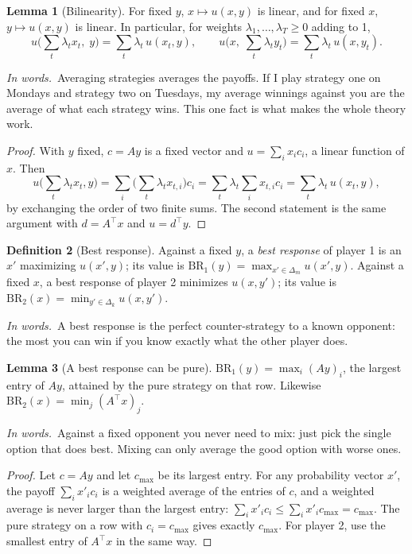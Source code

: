 \documentclass[11pt]{article}
\theoremstyle{definition}
\newtheorem{definition}{Definition}[section]
\newtheorem{lemma}[definition]{Lemma}
\newcommand{\inwords}{\par\smallskip\noindent\textit{In words.}\ }
\begin{document}
\begin{lemma}[Bilinearity]\label{lem:bilinear}
For fixed $y$, $x\mapsto u(x,y)$ is linear, and for fixed $x$, $y\mapsto u(x,y)$ is linear. In particular, for weights
$\lambda_1,\dots,\lambda_T\ge0$ adding to 1,
\[ u\Big(\sum_t\lambda_tx_t,\;y\Big)=\sum_t\lambda_t\,u(x_t,y),\qquad u\Big(x,\;\sum_t\lambda_ty_t\Big)=\sum_t\lambda_t\,u(x,y_t). \]
\inwords Averaging strategies averages the payoffs. If I play strategy one on Mondays and strategy two on Tuesdays, my
average winnings against you are the average of what each strategy wins. This one fact is what makes the whole theory
work.
\end{lemma}
\begin{proof}
With $y$ fixed, $c=Ay$ is a fixed vector and $u=\sum_ix_ic_i$, a linear function of $x$. Then
\[ u\Big(\sum_t\lambda_tx_t,y\Big)=\sum_i\Big(\sum_t\lambda_tx_{t,i}\Big)c_i=\sum_t\lambda_t\sum_ix_{t,i}c_i=\sum_t\lambda_t\,u(x_t,y), \]
by exchanging the order of two finite sums. The second statement is the same argument with $d=A^\top x$ and $u=d^\top y$.
\end{proof}

\begin{definition}[Best response]\label{def:br}
Against a fixed $y$, a \emph{best response} of player 1 is an $x'$ maximizing $u(x',y)$; its value is
$\mathrm{BR}_1(y)=\max_{x'\in\Delta_m}u(x',y)$. Against a fixed $x$, a best response of player 2 minimizes $u(x,y')$; its value
is $\mathrm{BR}_2(x)=\min_{y'\in\Delta_k}u(x,y')$.
\inwords A best response is the perfect counter-strategy to a known opponent: the most you can win if you know exactly
what the other player does.
\end{definition}

\begin{lemma}[A best response can be pure]\label{lem:pure}
$\mathrm{BR}_1(y)=\max_i(Ay)_i$, the largest entry of $Ay$, attained by the pure strategy on that row. Likewise
$\mathrm{BR}_2(x)=\min_j(A^\top x)_j$.
\inwords Against a fixed opponent you never need to mix: just pick the single option that does best. Mixing can only
average the good option with worse ones.
\end{lemma}
\begin{proof}
Let $c=Ay$ and let $c_{\max}$ be its largest entry. For any probability vector $x'$, the payoff $\sum_ix'_ic_i$ is a
weighted average of the entries of $c$, and a weighted average is never larger than the largest entry:
$\sum_ix'_ic_i\le\sum_ix'_ic_{\max}=c_{\max}$. The pure strategy on a row with $c_i=c_{\max}$ gives exactly $c_{\max}$.
For player 2, use the smallest entry of $A^\top x$ in the same way.
\end{proof}
\end{document}

